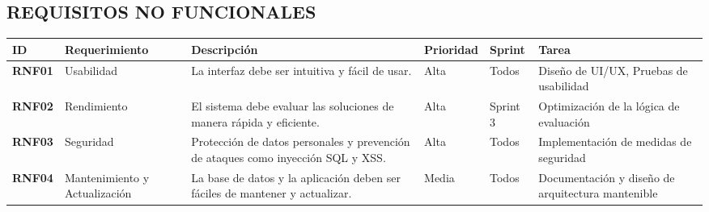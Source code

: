 \subsection{REQUISITOS NO FUNCIONALES}

    \begin{longtable}{|p{1.2cm}|p{2.5cm}|p{3cm}|p{1.8cm}|p{1.8cm}|p{2.5cm}|}
    \hline
        \textbf{ID} & \textbf{Requerimiento} & \textbf{Descripción} & \textbf{Prioridad} & \textbf{Sprint} & \textbf{Tarea} \\ \hline
        \textbf{RNF01} & Usabilidad & La interfaz debe ser intuitiva y fácil de usar. & Alta & Todos & Diseño de UI/UX, Pruebas de usabilidad \\ \hline
        \textbf{RNF02} & Rendimiento & El sistema debe evaluar las soluciones de manera rápida y eficiente. & Alta & Sprint 3 & Optimización de la lógica de evaluación \\ \hline
        \textbf{RNF03} & Seguridad & Protección de datos personales y prevención de ataques como inyección SQL y XSS. & Alta & Todos & Implementación de medidas de seguridad \\ \hline
        \textbf{RNF04} & Mantenimiento y Actualización & La base de datos y la aplicación deben ser fáciles de mantener y actualizar. & Media & Todos & Documentación y diseño de arquitectura mantenible \\ \hline
    \end{longtable}

